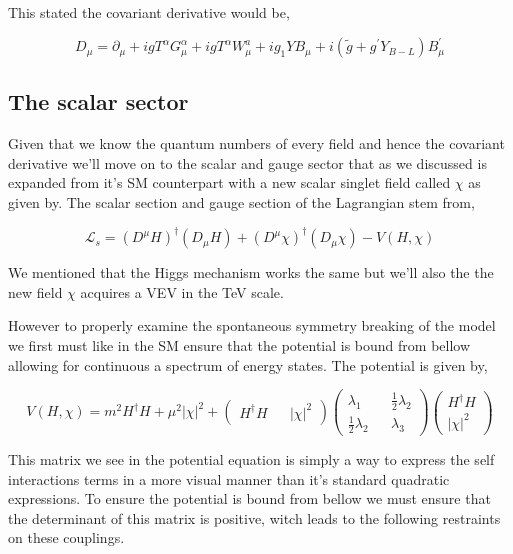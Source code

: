 \documentclass[11pt,twoside,a4paper]{article}
\begin{document}
This stated the covariant derivative would be, 

\begin{equation}
D_\mu = \partial_\mu + igT^\alpha G^\alpha_\mu + igT^\alpha W^a_\mu + ig_1YB_\mu + i(\tilde{g}+g^\prime Y_{B-L})B^\prime_\mu 
\end{equation}


\subsection{The scalar sector}	

Given that we know the quantum numbers of every field and hence the covariant derivative we'll move on to the scalar and gauge sector that as we discussed is expanded from it's SM counterpart with a new scalar singlet field called $\chi$ as given by. The scalar section and gauge section of the Lagrangian stem from, 

\begin{equation}
\mathcal{L}_s = (D^\mu H)^\dagger (D_\mu H) + (D^\mu \chi)^\dagger (D_\mu \chi) - V(H,\chi)
\end{equation}
 
We mentioned that the Higgs mechanism works the same but we'll also the the new field $\chi$ acquires a VEV in the TeV scale. 

However to properly examine the spontaneous symmetry breaking of the model we first must like in the SM ensure that the potential is bound from bellow allowing for continuous a spectrum of energy states. The potential is given by, 

\begin{equation}
 V(H,\chi) = m^2 H^\dagger H +  \mu^2 |\chi|^2 + \begin{pmatrix}
  H^\dagger H && |\chi|^2 \end{pmatrix}  \begin{pmatrix}   
  \lambda_1 && \frac{1}{2}   \lambda_2 \\
  \frac{1}{2}   \lambda_2   && \lambda_3
 \end{pmatrix} \begin{pmatrix}
   H^\dagger H \\ |\chi|^2 
 \end{pmatrix}
\end{equation}

This matrix we see in the potential equation is simply a way to express the self interactions terms in a more visual manner than it's standard quadratic expressions. To ensure the potential is bound from bellow we must ensure that the determinant of this matrix is positive, witch leads to the following restraints on these couplings. 
\end{document}
